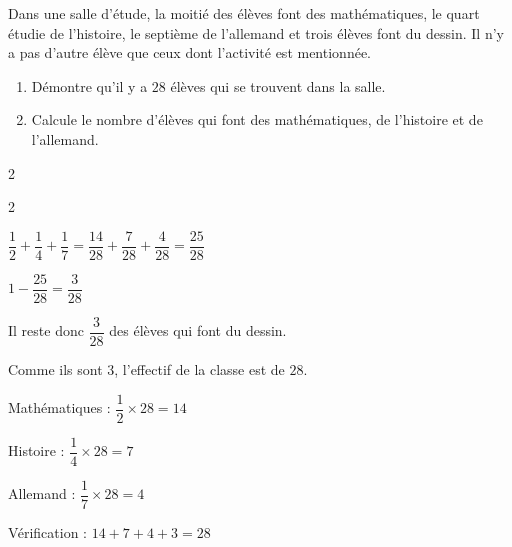 \begin{exercice*}
    Dans une salle d'étude, la moitié des élèves font des mathématiques, le quart étudie de
    l'histoire, le septième de l’allemand et trois élèves font du dessin. Il n'y a pas d’autre élève que ceux
    dont l'activité est mentionnée.
    \begin{enumerate}
        \item Démontre qu'il y a $28$ élèves qui se trouvent dans la salle.
        \item Calcule le nombre d'élèves qui font des mathématiques, de l'histoire et de l'allemand.
    \end{enumerate}
\end{exercice*}
\begin{corrige}
    \phantom{rrr}    
    \begin{multicols}2
        \begin{enumerate}
            \begin{spacing}2
            \item $\dfrac12 + \dfrac14 + \dfrac17 = \dfrac{14}{28}+\dfrac{7}{28}+\dfrac{4}{28}=\dfrac{25}{28}$
            
            $1 - \dfrac{25}{28} = \dfrac{3}{28}$
            
            Il reste donc $\dfrac{3}{28}$ des élèves qui font du dessin.

            Comme ils sont $3$, l'effectif de la classe est de $28$.
            \item Mathématiques : $\dfrac{1}{2}\times 28 = 14$
            
            Histoire : $\dfrac{1}{4}\times 28 = 7$

            Allemand : $\dfrac{1}{7}\times 28 = 4$

            Vérification : $14 + 7 + 4 + 3 = 28$
            \end{spacing}
        \end{enumerate}
    \end{multicols}
\end{corrige}

